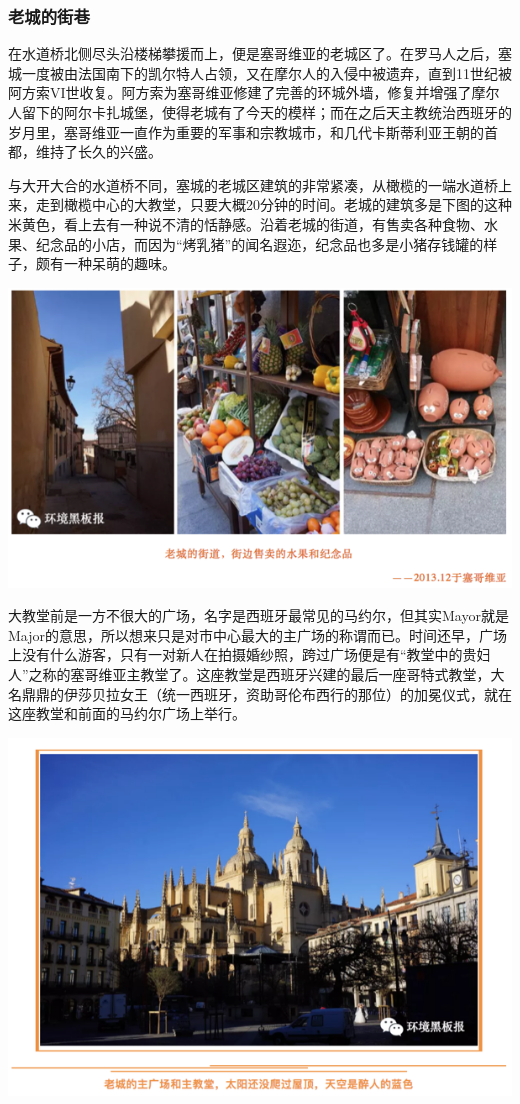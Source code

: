 \documentclass[
]{book}
\begin{document}
\hypertarget{ux8001ux57ceux7684ux8857ux5df7}{%
\subsubsection{老城的街巷}\label{ux8001ux57ceux7684ux8857ux5df7}}

在水道桥北侧尽头沿楼梯攀援而上，便是塞哥维亚的老城区了。在罗马人之后，塞城一度被由法国南下的凯尔特人占领，又在摩尔人的入侵中被遗弃，直到11世纪被阿方索VI世收复。阿方索为塞哥维亚修建了完善的环城外墙，修复并增强了摩尔人留下的阿尔卡扎城堡，使得老城有了今天的模样；而在之后天主教统治西班牙的岁月里，塞哥维亚一直作为重要的军事和宗教城市，和几代卡斯蒂利亚王朝的首都，维持了长久的兴盛。

与大开大合的水道桥不同，塞城的老城区建筑的非常紧凑，从橄榄的一端水道桥上来，走到橄榄中心的大教堂，只要大概20分钟的时间。老城的建筑多是下图的这种米黄色，看上去有一种说不清的恬静感。沿着老城的街道，有售卖各种食物、水果、纪念品的小店，而因为``烤乳猪''的闻名遐迩，纪念品也多是小猪存钱罐的样子，颇有一种呆萌的趣味。

\includegraphics[width=8.33in]{images/xt49}

大教堂前是一方不很大的广场，名字是西班牙最常见的马约尔，但其实Mayor就是Major的意思，所以想来只是对市中心最大的主广场的称谓而已。时间还早，广场上没有什么游客，只有一对新人在拍摄婚纱照，跨过广场便是有``教堂中的贵妇人''之称的塞哥维亚主教堂了。这座教堂是西班牙兴建的最后一座哥特式教堂，大名鼎鼎的伊莎贝拉女王（统一西班牙，资助哥伦布西行的那位）的加冕仪式，就在这座教堂和前面的马约尔广场上举行。

\includegraphics[width=8.33in]{images/xt50}
\end{document}
